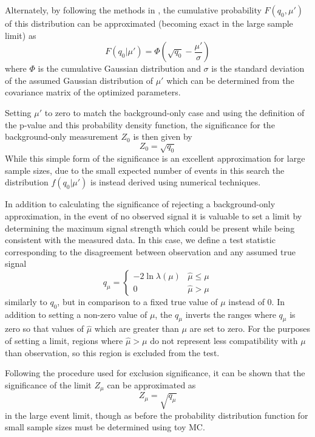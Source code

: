 Alternately, by following the methods in \cite{Cowan_2011}, the cumulative probability $F(q_0,\mu')$ of this distribution can be approximated (becoming exact in the large sample limit) as 
\begin{equation}
	F(q_0|\mu') = \Phi \left( \sqrt{q_0} - \frac{\mu'}{\sigma} \right)
\end{equation}
where $\Phi$ is the cumulative Gaussian distribution and $\sigma$ is the standard deviation of the assumed Gaussian distribution of $\mu'$ which can be determined from the covariance matrix of the optimized parameters.

Setting $\mu'$ to zero to match the background-only case and using the definition of the p-value and this probability density function, the significance for the background-only measurement $Z_0$ is then given by
\begin{equation}
	Z_0 = \sqrt{q_0}
\end{equation} 
While this simple form of the significance is an excellent approximation for large sample sizes, due to the small expected number of events in this search the distribution $f(q_0|\mu')$ is instead derived using numerical techniques.

In addition to calculating the significance of rejecting a background-only approximation, in the event of no observed signal it is valuable to set a limit by determining the maximum signal strength which could be present while being consistent with the measured data.
In this case, we define a test statistic corresponding to the disagreement between observation and any assumed true signal
\begin{equation}
    q_\mu = 
	\begin{cases} 
		-2 \ln \lambda(\mu) & \hat{\mu} \leq \mu\\
                 0                & \hat{\mu} > \mu 
        \end{cases}
\end{equation}
similarly to $q_0$, but in comparison to a fixed true value of $\mu$ instead of 0. 
In addition to setting a non-zero value of $\mu$, the $q_\mu$ inverts the ranges where $q_\mu$ is zero so that values of $\hat{\mu}$ which are greater than $\mu$ are set to zero.
For the purposes of setting a limit, regions where $\hat{\mu}>\mu$ do not represent less compatibility with $\mu$ than observation, so this region is excluded from the test.

Following the procedure used for exclusion significance, it can be shown that the significance of the limit $Z_\mu$ can be approximated as
\begin{equation}
	Z_\mu = \sqrt{q_\mu}
\end{equation}
in the large event limit, though as before the probability distribution function for small sample sizes must be determined using toy MC.

